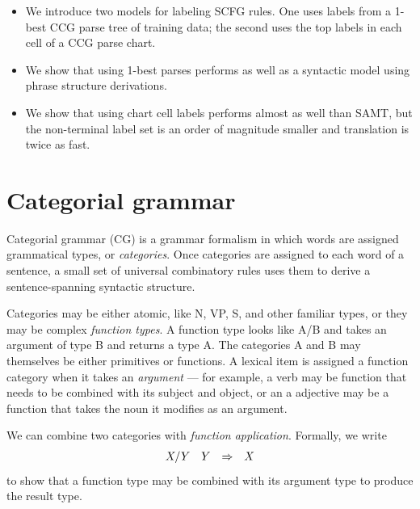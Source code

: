 \documentclass[a4paper]{article}
\begin{document}
%
%
\begin{itemize}
\item We introduce two models for labeling SCFG rules. One uses labels from a 1-best CCG parse tree of training data; the second uses the top labels in each cell of a CCG parse chart.
\item We show that using 1-best parses performs as well as a syntactic model using phrase structure derivations.
\item We show that using chart cell labels performs almost as well than SAMT, but the non-terminal label set is an order of magnitude smaller and translation is twice as fast.
\end{itemize}

\section{Categorial grammar}
\label{sec:cg}

Categorial grammar (CG) \cite{cg,bar-hillel-cg} is a grammar formalism in which words are assigned grammatical types, or {\em categories}. Once categories are assigned to each word of a sentence, a small set of universal combinatory rules uses them to derive a sentence-spanning syntactic structure.

Categories may be either atomic, like N, VP, S, and other familiar types, or they may be complex {\em function types}. A function type looks like A/B and takes an argument of type B and returns a type A. The categories A and B may themselves be either primitives or functions. A lexical item is assigned a function category when it takes an {\em argument} --- for example, a verb may be function that needs to be combined with its subject and object, or an a adjective may be a function that takes the noun it modifies as an argument.

We can combine two categories with {\em function application}. Formally, we write
\begin{equation}
\begin{array}{cccc} X/Y & Y & \Rightarrow & X \end{array}\label{eqn:forward-app}
\end{equation}
to show that a function type may be combined with its argument type to produce the result type.
\end{document}
